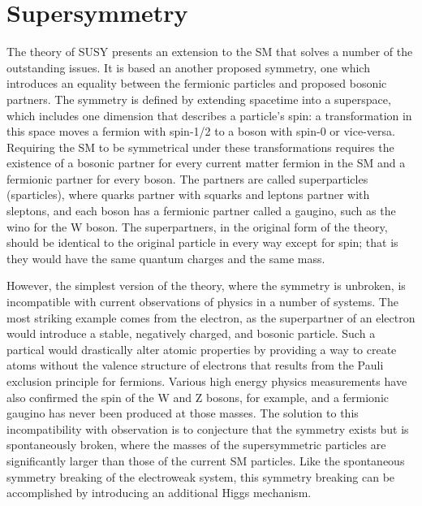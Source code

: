 \chapter{Supersymmetry}

\label{ch:supersymmetry}

The theory of \ac{SUSY} presents an extension to the \ac{SM} that solves a number of the outstanding issues. 
It is based an another proposed symmetry, one which introduces an equality between the fermionic particles and proposed bosonic partners.
The symmetry is defined by extending spacetime into a superspace, which includes one dimension that describes a particle's spin: a transformation in this space moves a fermion with spin-1/2 to a boson with spin-0 or vice-versa.
Requiring the \ac{SM} to be symmetrical under these transformations requires the existence of a bosonic partner for every current matter fermion in the \ac{SM} and a fermionic partner for every boson. 
The partners are called superparticles (sparticles), where quarks partner with squarks and leptons partner with sleptons, and each boson has a fermionic partner called a gaugino, such as the wino for the W boson.
The superpartners, in the original form of the theory, should be identical to the original particle in every way except for spin; that is they would have the same quantum charges and the same mass.

However, the simplest version of the theory, where the symmetry is unbroken, is incompatible with current observations of physics in a number of systems.
The most striking example comes from the electron, as the superpartner of an electron would introduce a stable, negatively charged, and bosonic particle. 
Such a partical would drastically alter atomic properties by providing a way to create atoms without the valence structure of electrons that results from the Pauli exclusion principle for fermions.
Various high energy physics measurements have also confirmed the spin of the W and Z bosons, for example, and a fermionic gaugino has never been produced at those masses.
The solution to this incompatibility with observation is to conjecture that the symmetry exists but is spontaneously broken, where the masses of the supersymmetric particles are significantly larger than those of the current \ac{SM} particles.
Like the spontaneous symmetry breaking of the electroweak system, this symmetry breaking can be accomplished by introducing an additional Higgs mechanism.

